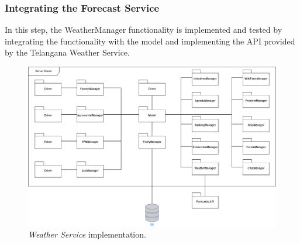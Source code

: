 \subsubsection{Integrating the Forecast Service}
In this step, the WeatherManager functionality is implemented and tested by integrating the functionality with the model and implementing the API provided by the Telangana Weather Service.
\begin{figure}[H]
    \centering
    \includegraphics[width=\textwidth]{Images/StepImplementation/Step4.png}
    \caption{\textit{Weather Service} implementation.}
\end{figure}
\newpage
